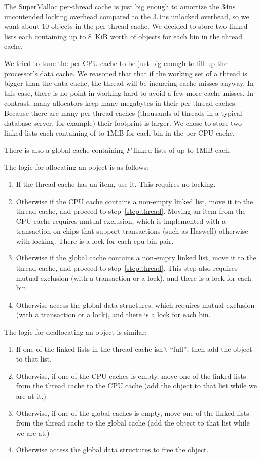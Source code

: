 \documentclass[pldi]{sigplanconf-pldi15}
\begin{document}
The SuperMalloc per-thread cache is just big enough to amortize the
$34$ns uncontended locking overhead compared to the $3.1$ns unlocked
overhead, so we want about $10$ objects in the per-thread cache.  We
decided to store two linked lists each containing up to 8~KiB worth of
objects for each bin in the thread cache.

We tried to tune the per-CPU cache to be just big enough to fill up
the processor's data cache.  We reasoned that that if the working set
of a thread is bigger than the data cache, the thread will be
incurring cache misses anyway. In this case, there is no point in
working hard to avoid a few more cache misses.  In contrast, many
allocators keep many megabytes in their per-thread caches.  Because
there are many per-thread caches (thousands of threads in a typical
database server, for example) their footprint is larger.  We chose to
store two linked lists each containing of to $1$MiB for each bin in
the per-CPU cache.

There is also a global cache containing $P$ linked lists of up to
$1$MiB each. 

The logic for allocating an object is as follows:
\begin{enumerate}
\item If the thread cache has an item, use it.  This requires no locking. \label{step:thread}
\item Otherwise if the CPU cache contains a non-empty linked list, move it to the thread cache, and proceed to step~\ref{step:thread}.  Moving an item from the CPU cache requires mutual exclusion, which is implemented with a transaction on chips that support transactions (such as Haswell) otherwise with locking. There is a lock for each cpu-bin pair.\label{step:cpu}
\item Otherwise if the global cache contains a non-empty linked list, move it to the thread cache, and proceed to step~\ref{step:thread}.  This step also requires mutual exclusion (with a transaction or a lock), and there is a lock for each bin.
\item Otherwise access the global data structures, which requires mutual exclusion (with a transaction or a lock), and there is a lock for each bin.
\end{enumerate}

The logic for deallocating an object is similar:
\begin{enumerate}
\item If one of the linked lists in the thread cache isn't ``full'', then add the object to that list.
\item Otherwise, if one of the CPU caches is empty, move one of the linked lists from the thread cache to the CPU cache (add the object to that list while we are at it.)
\item Otherwise, if one of the global caches is empty, move one of the linked lists from the thread cache to the global cache (add the object to that list while we are at.)
\item Otherwise access the global data structures to free the object.
\end{enumerate}
\end{document}
